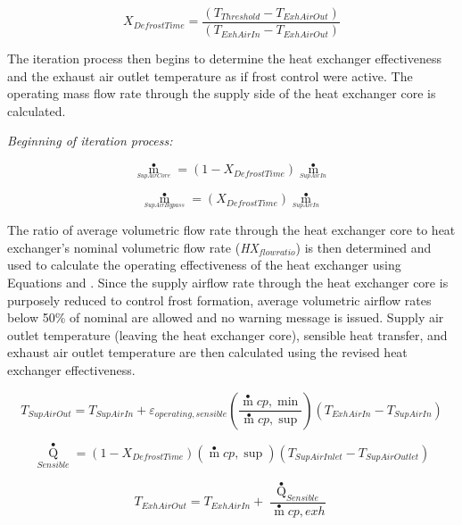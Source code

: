 \begin{equation}
{X_{DefrostTime}} = \frac{{({T_{Threshold}} - {T_{ExhAirOut}})}}{{({T_{ExhAirIn}} - {T_{ExhAirOut}})}}
\end{equation}

The iteration process then begins to determine the heat exchanger effectiveness and the exhaust air outlet temperature as if frost control were active. The operating mass flow rate through the supply side of the heat exchanger core is calculated.

\emph{Beginning of iteration process:}

\begin{equation}
{\mathop m\limits^ \bullet_{_{SupAirCore}}} = (1 - {X_{DefrostTime}}){\mathop m\limits^ \bullet_{_{SupAirIn}}}
\end{equation}

\begin{equation}
{\mathop m\limits^ \bullet_{_{SupAirBypass}}} = ({X_{DefrostTime}}){\mathop m\limits^ \bullet_{_{SupAirIn}}}
\end{equation}

The ratio of average volumetric flow rate through the heat exchanger core to heat exchanger's nominal volumetric flow rate (\emph{HX\(_{flowratio}\)}) is then determined and used to calculate the operating effectiveness of the heat exchanger using Equations and . Since the supply airflow rate through the heat exchanger core is purposely reduced to control frost formation, average volumetric airflow rates below 50\% of nominal are allowed and no warning message is issued. Supply air outlet temperature (leaving the heat exchanger core), sensible heat transfer, and exhaust air outlet temperature are then calculated using the revised heat exchanger effectiveness.

\begin{equation}
{T_{SupAirOut}} = {T_{SupAirIn}} + {\varepsilon_{operating,sensible}}\left( {\frac{{\mathop m\limits^ \bullet  cp,\min }}{{\mathop m\limits^ \bullet  cp,\sup }}} \right)({T_{ExhAirIn}} - {T_{SupAirIn}})
\end{equation}

\begin{equation}
{\mathop Q\limits^ \bullet_{Sensible}} = (1 - {X_{DefrostTime}})\left( {\mathop m\limits^ \bullet  cp,\sup } \right)({T_{SupAirInlet}} - {T_{SupAirOutlet}})
\end{equation}

\begin{equation}
{T_{ExhAirOut}} = {T_{ExhAirIn}} + \frac{{{{\mathop Q\limits^ \bullet  }_{Sensible}}}}{{\mathop m\limits^ \bullet  cp,exh}}
\end{equation}

